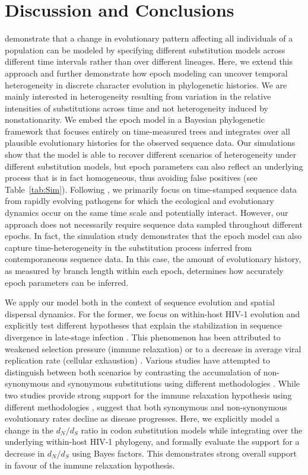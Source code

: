 \section{Discussion and Conclusions}

\citet{Goode2008} demonstrate that a change in evolutionary pattern affecting all individuals of a population can be modeled by specifying different substitution models across different time intervals rather than over different lineages.
Here, we extend this approach and further demonstrate how epoch modeling can uncover temporal heterogeneity in discrete character evolution in phylogenetic histories.
We are mainly interested in heterogeneity resulting from variation in the relative intensities of substitutions across time and not heterogeneity induced by nonstationarity.
We embed the epoch model in a Bayesian phylogenetic framework that focuses entirely on time-measured trees and integrates over all plausible evolutionary histories for the observed sequence data.
Our simulations show that the model is able to recover different scenarios of heterogeneity under different substitution models, but epoch parameters can also reflect an underlying process that is in fact homogeneous, thus avoiding false positives (see Table~\ref{tab:Sim}).
Following \citet{Goode2008}, we primarily focus on time-stamped sequence data from rapidly evolving pathogens for which the ecological and evolutionary dynamics occur on the same time scale and potentially interact.
However, our approach does not necessarily require sequence data sampled throughout different epochs.
In fact, the simulation study demonstrates that the epoch model can also capture time-heterogeneity in the substitution process inferred from contemporaneous sequence data. 
In this case, the amount of evolutionary history, as measured by branch length within each epoch, determines how accurately epoch parameters can be inferred.

We apply our model both in the context of sequence evolution and spatial dispersal dynamics.
For the former, we focus on within-host HIV-1 evolution and explicitly test different hypotheses that explain the stabilization in sequence divergence in late-stage infection \citep{Shankarappa1999}.
This phenomenon has been attributed to weakened selection pressure (immune relaxation) or to a decrease in average viral replication rate (cellular exhaustion) \citep{williamson2005}.
Various studies have attempted to distinguish between both scenarios by contrasting the accumulation of non-synonymous and synonymous  substitutions using different methodologies \citep{williamson2005,Lemey2007,Lee2008}.
While two studies provide strong support for the immune relaxation hypothesis using different methodologies \citep{williamson2005,Lemey2007}, \citet{Lee2008} suggest that both synonymous and non-synonymous evolutionary rates decline as disease progresses.
Here, we explicitly model a change in the $d_N/d_S$ ratio in codon substitution models while integrating over the underlying within-host HIV-1 phylogeny, and formally evaluate the support for a decrease in $d_N/d_S$ using Bayes factors. 
This demonstrates strong overall support in favour of the immune relaxation hypothesis.

